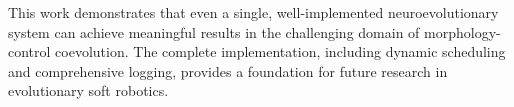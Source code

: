\documentclass[conference]{IEEEtran}
\begin{document}
This work demonstrates that even a single, well-implemented neuroevolutionary system can achieve meaningful results in the challenging domain of morphology-control coevolution. The complete implementation, including dynamic scheduling and comprehensive logging, provides a foundation for future research in evolutionary soft robotics.



\end{document}
